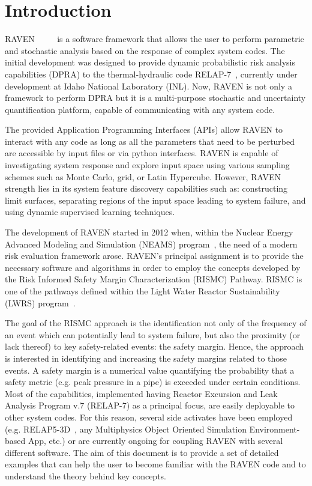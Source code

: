 \section{Introduction}
RAVEN~\cite{alfonsiMC} ~\cite{alfonsiPSA}~\cite{RAVENFY13}~\cite{ESREL2014} is a software framework that allows the user to perform parametric and stochastic
analysis based on the response of complex system codes.
The initial development was designed to provide dynamic probabilistic risk analysis
capabilities (DPRA) to the thermal-hydraulic code RELAP-7~\cite{relap7FY12}, currently under development
at Idaho National Laboratory (INL).
Now, RAVEN is not only a framework to perform DPRA but it is a
multi-purpose stochastic and uncertainty quantification platform, capable of communicating with any system code.

The provided Application Programming
Interfaces (APIs) allow RAVEN to interact with any code as long as all the parameters
that need to be perturbed are accessible by input files or via python
interfaces.
RAVEN is capable of investigating system response and explore input space using various
sampling schemes such as Monte Carlo, grid, or Latin Hypercube.
However, RAVEN strength lies in its system feature discovery capabilities such as: constructing
limit surfaces, separating regions of the input space leading to system failure,
and using dynamic supervised learning techniques.

The development of RAVEN started in 2012 when, within the Nuclear Energy
Advanced Modeling and Simulation (NEAMS) program~\cite{neams}, the need of a modern
risk evaluation framework arose.
RAVEN's principal assignment is to provide the necessary software and algorithms
in order to employ the concepts developed by the Risk Informed Safety Margin
Characterization (RISMC) Pathway.
RISMC is one of the pathways defined within the Light Water Reactor
Sustainability (LWRS) program~\cite{lwrs}.

The goal of the RISMC approach is  the identification not only of the frequency of an
event which can potentially lead to system failure, but also the proximity (or lack
thereof) to key safety-related events: the safety margin.
Hence, the approach is interested in identifying and increasing the safety
margins related to those events.
A safety margin is a numerical value quantifying the probability that a safety
metric (e.g. peak pressure in a pipe) is exceeded under certain conditions.
Most of the capabilities, implemented having Reactor Excursion and Leak Analysis Program v.7
(RELAP-7) as a principal focus, are
easily deployable to other system codes.
%
For this reason, several side activates have been employed (e.g.  RELAP5-3D~\cite{RELAP5userManual}, any Multiphysics Object Oriented
Simulation Environment-based App, etc.)
or are currently ongoing for coupling RAVEN with several different software.
%
The aim of this document is to provide a set of detailed examples that can help the user to become familiar with the RAVEN code and to understand the theory behind key concepts.
